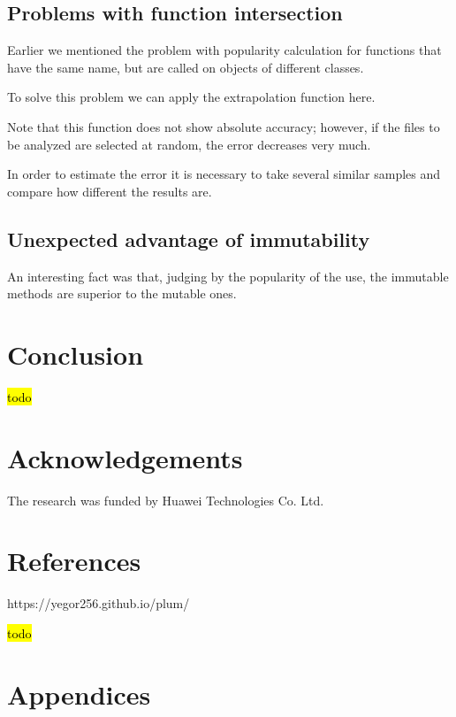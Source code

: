 \documentclass[anonymous,sigplan,review,11pt,nonacm,natbib=false]{acmart}
\begin{document}
    \subsection{Problems with function intersection}

    Earlier we mentioned the problem with popularity calculation for functions that have the same name, but are called on objects of different classes.

    To solve this problem we can apply the extrapolation function here.

    Note that this function does not show absolute accuracy; however, if the files to be analyzed are selected at random, the error decreases very much.

    In order to estimate the error it is necessary to take several similar samples and compare how different the results are.

    \subsection{Unexpected advantage of immutability}

    An interesting fact was that, judging by the popularity of the use, the immutable methods are superior to the mutable ones.

    \section{Conclusion}\label{sec:conclusion}

    \hl{todo}

    \section{Acknowledgements}

    The research was funded by Huawei Technologies Co. Ltd.

    \section{References}

    https://yegor256.github.io/plum/

    \hl{todo}

    \section{Appendices}

    \label{table 1}
\end{document}
